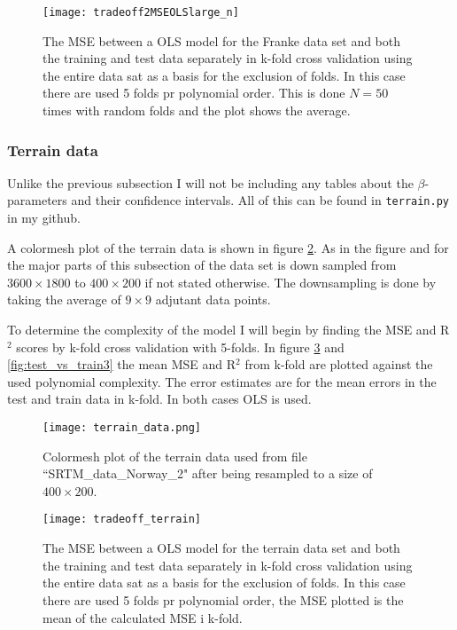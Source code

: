 \documentclass[uio,jmp,amsmath,amssymb,reprint,nofootinbib]{revtex4-1}
\numberwithin{equation}{section}
\begin{document}
\begin{figure}[H]
    \centering
    \texttt{[image: tradeoff2MSEOLSlarge\_n]}
    \caption{The MSE between a OLS model for the Franke data set and both the training and test data separately in k-fold cross validation using the entire data sat as a basis for the exclusion of folds. In this case there are used 5 folds pr polynomial order. This is done \(N=50\) times with random folds and the plot shows the average.}
    \label{fig:test_vs_trainlarge_n}
\end{figure}

\subsubsection{Terrain data}

Unlike the previous subsection I will not be including any tables about the \(\beta\)-parameters and their confidence intervals. All of this can be found in \texttt{terrain.py} in my github. 

A colormesh plot of the terrain data is shown in figure \ref{fig:terrain_data}. As in the figure and for the major parts of this subsection of the data set is down sampled from \(3600\times 1800\) to \(400\times 200\) if not stated otherwise. The downsampling is done by taking the average of \(9\times 9\) adjutant data points.

To determine the complexity of the model I will begin by finding the MSE and R\(^2\) scores by k-fold cross validation with 5-folds. In figure \ref{fig:test_vs_train2} and \ref{fig:test_vs_train3} the mean MSE and R\(^2\) from k-fold are plotted against the used polynomial complexity. The error estimates are for the mean errors in the test and train data in k-fold. In both cases OLS is used.

\begin{figure}[H]
    \centering
    \texttt{[image: terrain\_data.png]}
    \caption{Colormesh plot of the terrain data used from file ``SRTM\_data\_Norway\_2" after being resampled to a size of \(400\times 200\).}
    \label{fig:terrain_data}
\end{figure}

\begin{figure}[H]
    \centering
    \texttt{[image: tradeoff\_terrain]}
    \caption{The MSE between a OLS model for the terrain data set and both the training and test data separately in k-fold cross validation using the entire data sat as a basis for the exclusion of folds. In this case there are used 5 folds pr polynomial order, the MSE plotted is the mean of the calculated MSE i k-fold.}
    \label{fig:test_vs_train2}
\end{figure}
\end{document}

